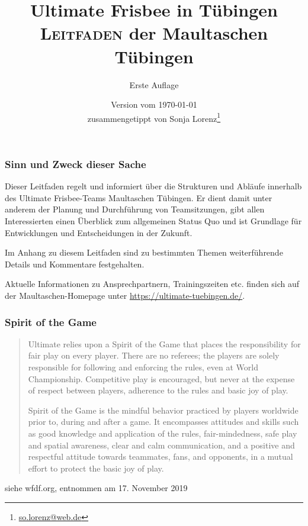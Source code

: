 \documentclass[a4 paper, 11pt]{article}
\title{{\normalsize Ultimate Frisbee in Tübingen} \\ \textbf{\textsc{Leitfaden} der Maultaschen Tübingen}}
\author{Erste Auflage}
\date{Version vom \today \\ {\footnotesize zusammengetippt von Sonja Lorenz\footnote{\href{mailto:so.lorenz@web.de}{so.lorenz@web.de}}}}
\begin{document}
	
\pagestyle{fancy} %

\maketitle

\vspace{1cm}

\thispagestyle{empty}

\subsubsection*{Sinn und Zweck dieser Sache}
Dieser Leitfaden regelt und informiert über die Strukturen und Abläufe innerhalb des Ultimate Frisbee-Teams \glqq Maultaschen Tübingen\grqq.
Er dient damit unter anderem der Planung und Durchführung von Teamsitzungen, gibt allen Interessierten einen Überblick zum allgemeinen Status Quo und ist Grundlage für Entwicklungen und Entscheidungen in der Zukunft.

Im Anhang zu diesem Leitfaden sind zu bestimmten Themen weiterführende Details und Kommentare festgehalten. 

Aktuelle Informationen zu Ansprechpartnern, Trainingszeiten etc. finden sich auf der Maultaschen-Homepage unter \url{https://ultimate-tuebingen.de/}.

\vspace{2cm}

\subsubsection*{\glqq Spirit of the Game\grqq}
\begin{quote}
Ultimate relies upon a Spirit of the Game that places the responsibility for fair play on every player. There are no referees; the players are solely responsible for following and enforcing the rules, even at World Championship. Competitive play is encouraged, but never at the expense of respect between players, adherence to the rules and basic joy of play.

Spirit of the Game is the mindful behavior practiced by players worldwide prior to, during and after a game. It encompasses attitudes and skills such as good knowledge and application of the rules, fair-mindedness, safe play and spatial awareness, clear and calm communication, and a positive and respectful attitude towards teammates, fans, and opponents, in a mutual effort to protect the basic joy of play.
\end{quote}
\begin{flushright}
	\scriptsize{siehe wfdf.org, entnommen am 17. November 2019}
\end{flushright}
\end{document}
